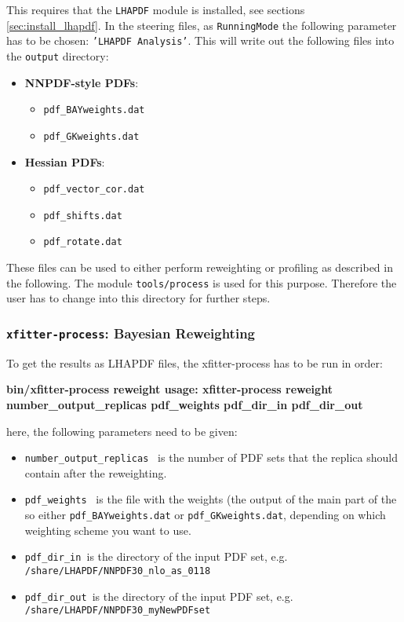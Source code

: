 This requires that the {\tt LHAPDF} module is installed, see sections \ref{sec:install_lhapdf}. In the \fitter steering files, as {\tt RunningMode} the following parameter has to be chosen: {\tt 'LHAPDF Analysis'}. This will write out the following files into the {\tt output} directory:

\begin{itemize}
 \item \textbf{NNPDF-style PDFs}:
 \begin{itemize}
  \item {\tt pdf\_BAYweights.dat}
  \item {\tt pdf\_GKweights.dat}
 \end{itemize}
  \item \textbf{Hessian PDFs}:
 \begin{itemize}
   \item {\tt{pdf\_vector\_cor.dat}}
   \item {\tt{pdf\_shifts.dat}}
   \item {\tt{pdf\_rotate.dat}}  
\end{itemize}
\end{itemize}


These files can be used to either perform reweighting or profiling as described in the following. The module {\tt tools/process} is used for this purpose. Therefore the user has to change into this directory for further steps. 

\subsubsection{{\tt xfitter-process}: Bayesian Reweighting}

To get the results as LHAPDF files, the xfitter-process has to be run in order:

\textbf{bin/xfitter-process reweight
usage: xfitter-process reweight number\_output\_replicas pdf\_weights pdf\_dir\_in pdf\_dir\_out}

here, the following parameters need to be given:
\begin{itemize}
\item {\tt number\_output\_replicas } is the number of PDF sets that the replica should contain after the reweighting. 
\item {\tt pdf\_weights  } is the file with the weights (the output of the main part of the \fitter so either {\tt pdf\_BAYweights.dat} or {\tt pdf\_GKweights.dat}, depending on which weighting scheme you want to use.
\item {\tt pdf\_dir\_in }is the directory of the input PDF set, e.g. {\tt /share/LHAPDF/NNPDF30\_nlo\_as\_0118}
\item {\tt pdf\_dir\_out }is the directory of the input PDF set, e.g. {\tt /share/LHAPDF/NNPDF30\_myNewPDFset}
\end{itemize}


